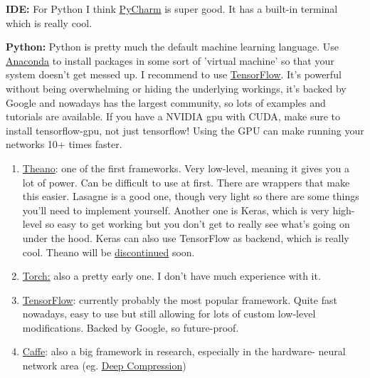 \documentclass[]{article}
\begin{document}
\textbf{IDE:} For Python I think \href{https://docs.anaconda.com/anaconda/user-guide/tasks/integration/pycharm}{PyCharm} is super good. It has a built-in terminal which is really cool. 

\textbf{Python: } Python is pretty much the default machine learning language. Use \href{https://www.anaconda.com/download/#linux}{Anaconda} to install packages in some sort of 'virtual machine' so that your system doesn't get messed up.
I recommend to use \href{https://www.tensorflow.org/get_started/}{TensorFlow}. It's powerful without being overwhelming or hiding the underlying workings, it's backed by Google and nowadays has the largest community, so lots of examples and tutorials are available. 
If you have a NVIDIA gpu with CUDA, make sure to install tensorflow-gpu, not just tensorflow! Using the GPU can make running your networks 10+ times faster.

\begin{enumerate}
	\item \href{http://www.deeplearning.net/software/theano/}{Theano}: one of the first frameworks. Very low-level, meaning it gives you a lot of power. Can be difficult to use at first. There are wrappers that make this easier. Lasagne is a good one, though very light so there are some things you'll need to implement yourself. Another one is Keras, which is very high-level so easy to get working but you don't get to really see what's going on under the hood. Keras can also use TensorFlow as backend, which is really cool. Theano will be \href{https://groups.google.com/forum/#!topic/theano-users/7Poq8BZutbY}{discontinued} soon.
	\item \href{http://torch.ch/Torch}{Torch:} also a pretty early one. I don't have much experience with it.
	\item \href{https://www.tensorflow.org/}{TensorFlow}: currently probably the most popular framework. Quite fast nowadays, easy to use but still allowing for lots of custom low-level modifications. Backed by Google, so future-proof. 
	\item \href{http://caffe.berkeleyvision.org/}{Caffe}: also a big framework in research, especially in the hardware- neural network area (eg. \href{https://arxiv.org/abs/1510.00149}{Deep Compression})
\end{enumerate}
\end{document}
